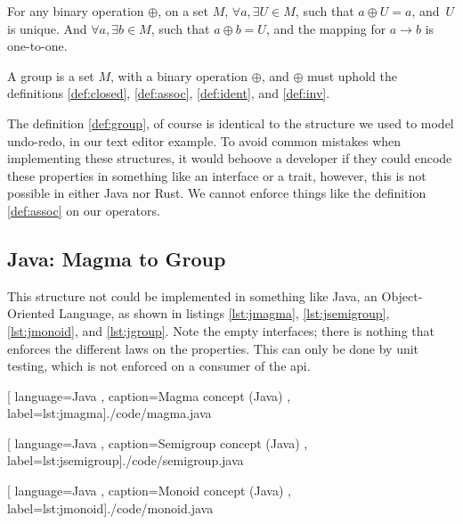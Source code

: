 \begin{definition} \label{def:inv}
  For any binary operation $\oplus$, on a set $M$,
  $\forall a, \exists U \in M$, such that
  $a \oplus U = a$, and $U$ is unique.
  And $\forall a, \exists b \in M$, such that $a \oplus b = U$, and the mapping
  for $a \to b$ is one-to-one.
\end{definition}

\begin{definition}[Group] \label{def:group}
  A group is a set $M$, with a binary operation $\oplus$, and $\oplus$ must
  uphold the definitions \ref{def:closed}, \ref{def:assoc}, \ref{def:ident},
  and \ref{def:inv}.
\end{definition}

The definition \ref{def:group}, of course is identical to the structure we used
to model undo-redo, in our text editor example. To avoid common mistakes when
implementing these structures, it would behoove a developer if they could encode
these properties in something like an interface or a trait, however, this is not
possible in either Java nor Rust. We cannot enforce things like the definition
\ref{def:assoc} on our operators.

\subsection{Java: Magma to Group}

This structure not could be implemented in something like Java, an
Object-Oriented Language, as shown in listings \ref{lst:jmagma},
\ref{lst:jsemigroup}, \ref{lst:jmonoid}, and \ref{lst:jgroup}. Note the empty
interfaces; there is nothing that enforces the different laws on the properties.
This can only be done by unit testing, which is not enforced on a consumer of
the \gls{api}.

\begin{center}
  
    [ language=Java
    , caption={Magma concept (Java)}
    , label=lst:jmagma]{./code/magma.java}
\end{center}

\begin{center}
  
    [ language=Java
    , caption={Semigroup concept (Java)}
    , label=lst:jsemigroup]{./code/semigroup.java}
\end{center}

\begin{center}
  
    [ language=Java
    , caption={Monoid concept (Java)}
    , label=lst:jmonoid]{./code/monoid.java}
\end{center}

